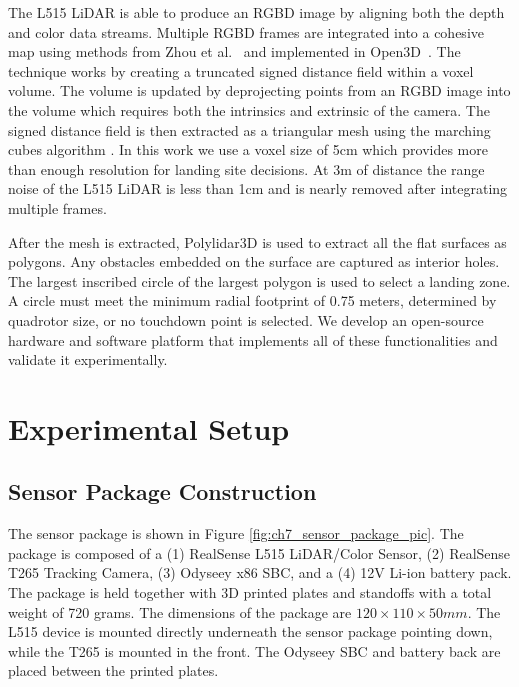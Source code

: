The L515 LiDAR is able to produce an \ac{RGBD} image by aligning both the depth and color data streams. Multiple \ac{RGBD} frames are integrated into a cohesive map using methods from Zhou et al.~\cite{zhou_dense_2013} and implemented in Open3D~\cite{zhou_open3d_2018}. The technique works by creating a truncated signed distance field within a voxel volume.  The volume is updated by deprojecting points from an RGBD image into the volume which requires both the intrinsics and extrinsic of the camera. The signed distance field is then extracted as a triangular mesh using the marching cubes algorithm \cite{10.1145/37401.37422}.  In this work we use a voxel size of 5cm which provides more than enough resolution for landing site decisions. At 3m of distance the range noise of the L515 LiDAR is less than 1cm \cite{nxp:tja1043} and is nearly removed after integrating multiple frames.

After the mesh is extracted, Polylidar3D is used to extract all the flat surfaces as polygons. Any obstacles embedded on the surface are captured as interior holes. The largest inscribed circle of the largest polygon is used to select a landing zone.  A circle must meet the minimum radial footprint of 0.75 meters, determined by quadrotor size, or no touchdown point is selected. We develop an open-source hardware and software platform that implements all of these functionalities and validate it experimentally.


\section{Experimental Setup}

\subsection{Sensor Package Construction}

The sensor package is shown in Figure \ref{fig:ch7_sensor_package_pic}. The package is composed of a (1) RealSense L515 LiDAR/Color Sensor, (2) RealSense T265 Tracking Camera, (3) Odyseey x86 \ac{SBC}, and a (4) 12V Li-ion battery pack. The package is held together with 3D printed plates and standoffs with a total weight of 720 grams. The dimensions of the package are $120 \times 110 \times 50 mm$. The L515 device is mounted directly underneath the sensor package pointing down, while the T265 is mounted in the front. The Odyseey \ac{SBC} and battery back are placed between the printed plates.

